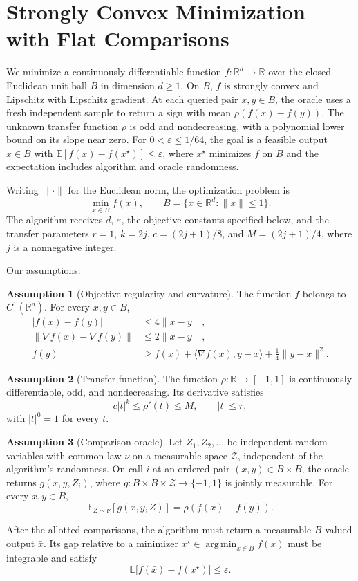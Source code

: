 \documentclass[10pt]{article}
\theoremstyle{definition}
\newtheorem{assumption}{Assumption}
\begin{document}
\section*{Strongly Convex Minimization with Flat Comparisons}
We minimize a continuously differentiable function $f:\mathbb{R}^d\to\mathbb{R}$ over the closed Euclidean unit ball $B$ in dimension $d\geq 1$. On $B$, $f$ is strongly convex and Lipschitz with Lipschitz gradient. At each queried pair $x,y\in B$, the oracle uses a fresh independent sample to return a sign with mean $\rho(f(x)-f(y))$. The unknown transfer function $\rho$ is odd and nondecreasing, with a polynomial lower bound on its slope near zero. For $0<\varepsilon\leq 1/64$, the goal is a feasible output $\bar{x}\in B$ with $\mathbb{E}[f(\bar{x})-f(x^\star)]\leq\varepsilon$, where $x^\star$ minimizes $f$ on $B$ and the expectation includes algorithm and oracle randomness.

Writing $\|\cdot\|$ for the Euclidean norm, the optimization problem is
\[
\min_{x\in B} f(x), \qquad B=\{x\in\mathbb{R}^d:\|x\|\leq 1\}.
\]
The algorithm receives $d$, $\varepsilon$, the objective constants specified below, and the transfer parameters $r=1$, $k=2j$, $c=(2j+1)/8$, and $M=(2j+1)/4$, where $j$ is a nonnegative integer.

Our assumptions:
\begin{assumption}[Objective regularity and curvature]
The function $f$ belongs to $C^1(\mathbb{R}^d)$. For every $x,y\in B$,
\[
\begin{aligned}
|f(x)-f(y)| &\leq 4\|x-y\|,\\
\|\nabla f(x)-\nabla f(y)\| &\leq 2\|x-y\|,\\
f(y) &\geq f(x)+\langle\nabla f(x),y-x\rangle
             +\tfrac14\|y-x\|^2.
\end{aligned}
\]
\end{assumption}

\begin{assumption}[Transfer function]
The function $\rho:\mathbb{R}\to[-1,1]$ is continuously differentiable, odd, and nondecreasing. Its derivative satisfies
\[
c|t|^k\leq \rho'(t)\leq M, \qquad |t|\leq r,
\]
with $|t|^0=1$ for every $t$.
\end{assumption}

\begin{assumption}[Comparison oracle]
Let $Z_1,Z_2,\ldots$ be independent random variables with common law $\nu$ on a measurable space $\mathcal{Z}$, independent of the algorithm's randomness. On call $i$ at an ordered pair $(x,y)\in B\times B$, the oracle returns $g(x,y,Z_i)$, where $g:B\times B\times\mathcal{Z}\to\{-1,1\}$ is jointly measurable. For every $x,y\in B$,
\[
\mathbb{E}_{Z\sim\nu}[g(x,y,Z)]=\rho(f(x)-f(y)).
\]
\end{assumption}

After the allotted comparisons, the algorithm must return a measurable $B$-valued output $\bar{x}$. Its gap relative to a minimizer $x^\star\in\operatorname*{arg\,min}_{x\in B}f(x)$ must be integrable and satisfy
\[
\mathbb{E}\bigl[f(\bar{x})-f(x^\star)\bigr]\leq\varepsilon.
\]
\end{document}

